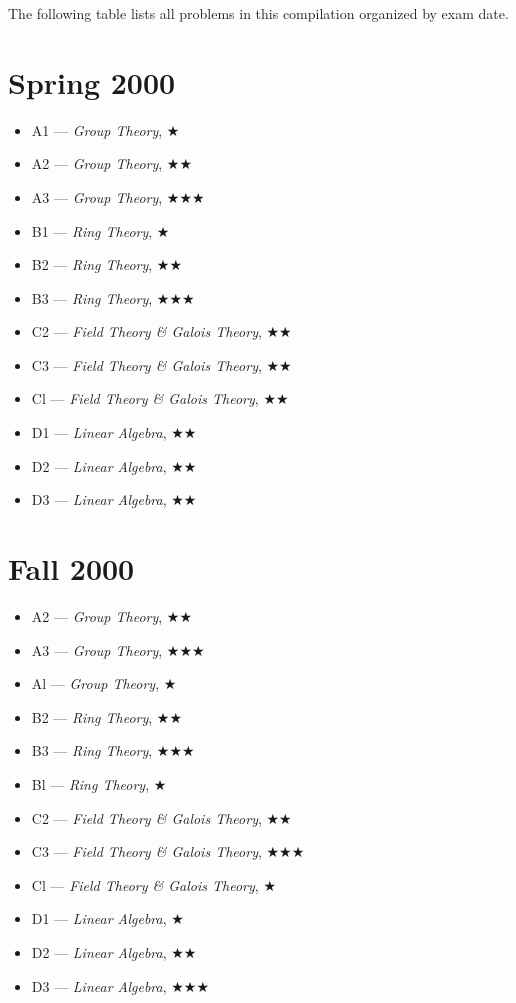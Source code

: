 \documentclass[11pt,letterpaper]{book}
\begin{document}
The following table lists all problems in this compilation organized by exam date.

\section*{Spring 2000}
\begin{itemize}
\item A1 --- \textit{Group Theory}, $\bigstar$
\item A2 --- \textit{Group Theory}, $\bigstar\bigstar$
\item A3 --- \textit{Group Theory}, $\bigstar\bigstar\bigstar$
\item B1 --- \textit{Ring Theory}, $\bigstar$
\item B2 --- \textit{Ring Theory}, $\bigstar\bigstar$
\item B3 --- \textit{Ring Theory}, $\bigstar\bigstar\bigstar$
\item C2 --- \textit{Field Theory \& Galois Theory}, $\bigstar\bigstar$
\item C3 --- \textit{Field Theory \& Galois Theory}, $\bigstar\bigstar$
\item Cl --- \textit{Field Theory \& Galois Theory}, $\bigstar\bigstar$
\item D1 --- \textit{Linear Algebra}, $\bigstar\bigstar$
\item D2 --- \textit{Linear Algebra}, $\bigstar\bigstar$
\item D3 --- \textit{Linear Algebra}, $\bigstar\bigstar$
\end{itemize}

\section*{Fall 2000}
\begin{itemize}
\item A2 --- \textit{Group Theory}, $\bigstar\bigstar$
\item A3 --- \textit{Group Theory}, $\bigstar\bigstar\bigstar$
\item Al --- \textit{Group Theory}, $\bigstar$
\item B2 --- \textit{Ring Theory}, $\bigstar\bigstar$
\item B3 --- \textit{Ring Theory}, $\bigstar\bigstar\bigstar$
\item Bl --- \textit{Ring Theory}, $\bigstar$
\item C2 --- \textit{Field Theory \& Galois Theory}, $\bigstar\bigstar$
\item C3 --- \textit{Field Theory \& Galois Theory}, $\bigstar\bigstar\bigstar$
\item Cl --- \textit{Field Theory \& Galois Theory}, $\bigstar$
\item D1 --- \textit{Linear Algebra}, $\bigstar$
\item D2 --- \textit{Linear Algebra}, $\bigstar\bigstar$
\item D3 --- \textit{Linear Algebra}, $\bigstar\bigstar\bigstar$
\end{itemize}
\end{document}
